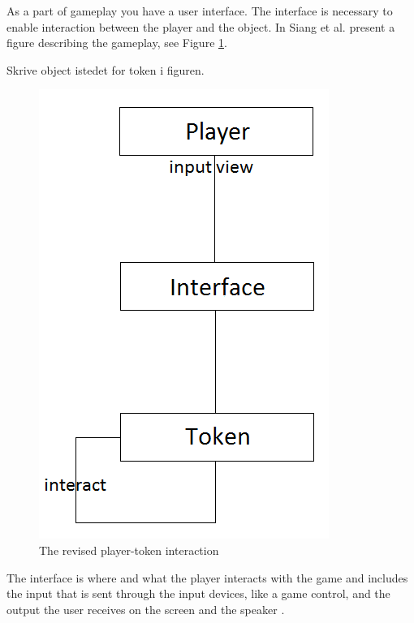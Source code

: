 As a part of gameplay you have a user interface. The interface is necessary to enable interaction between the player and the object. In \cite{umlapproach} Siang et al. present a figure describing the gameplay, see Figure \ref{fig:playerinterface}.

Skrive object istedet for token i figuren. 

\begin{figure}
\begin{center}
\includegraphics[scale=0.5]{playerinterface}
\caption[The revised player-token interaction]{The revised player-token interaction \cite{umlapproach}}
\label{fig:playerinterface}
\end{center}
\end{figure} 

The interface is where and what the player interacts with the game and includes the input that is sent through the input devices, like a game control, and the output the user receives on the screen and the speaker \cite{umlapproach}.

